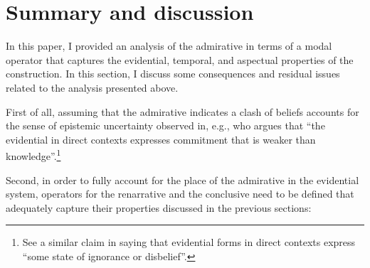 \documentclass[output=paper,
colorlinks,
citecolor=brown,
newtxmath
]{langscibook}
\begin{document}
\section{Summary and discussion}\label{sec:summary-disc}

In this paper, I provided an analysis of the  admirative in terms of a modal operator that captures the evidential, temporal, and aspectual properties of the construction.
In this section, I discuss some consequences and residual issues related to the analysis presented above.

First of all, assuming that the admirative indicates a clash of beliefs accounts for the sense of epistemic uncertainty observed in, e.g., \citet[510]{Smirnova2013} who argues that ``the evidential in direct contexts expresses commitment that is weaker than knowledge''.\footnote{See a similar claim in \citet[25]{Friedman1981} saying that  evidential forms in direct contexts express ``some state of ignorance or disbelief''.}

Second, in order to fully account for the place of the admirative in the evidential system, operators for the renarrative and the conclusive need to be defined that adequately capture their properties discussed in the previous sections:
\end{document}
